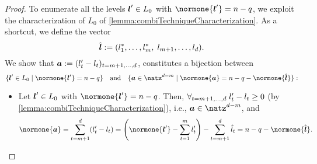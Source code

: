 \begin{proof}
  To enumerate all the levels ${\boldsymbol{l}}' \in L_0$ with $\normone{\*l'} = n - q$,
  we exploit the characterization of $L_0$ of
  \cref{lemma:combiTechniqueCharacterization}.
  As a shortcut, we define the vector
  \begin{equation}
    \hat{{\boldsymbol{l}}}
    := (l^\ast_1, \dotsc, l^\ast_m,\; l_{m+1}, \dotsc, l_d).
  \end{equation}
  We show that ${\boldsymbol{a}} := (l'_t - l_t)_{t = m+1, \dotsc, d}$,
  constitutes a bijection between
  \begin{equation}
    \{\*l' \in L_0 \mid \normone{\*l'} = n - q\}
    \quad\text{and}\quad
    \{\*a \in \natz^{d-m} \mid \normone{\*a} = n - q - \normone{\hat{\*l}}\}:
  \end{equation}
  \begin{itemize}
    \item
    Let ${\boldsymbol{l}}' \in L_0$ with $\normone{\*l'} = n - q$.
    Then, $\forall_{t=m+1,\dotsc,d}\;l'_t - l_t \ge 0$
    (by \cref{lemma:combiTechniqueCharacterization}), i.e.,
    $\*a \in \natz^{d-m}$, and
    \begin{equation}
      \normone{\*a}
      = \sum_{t=m+1}^d (l'_t - l_t)
      = \left(\normone{\*l'} - \sum_{t=1}^m l'_t\right) -
      \sum_{t=m+1}^d \hat{l}_t
      = n - q - \normone{\hat{\*l}}.
    \end{equation}
    

\end{itemize}
\end{proof}
